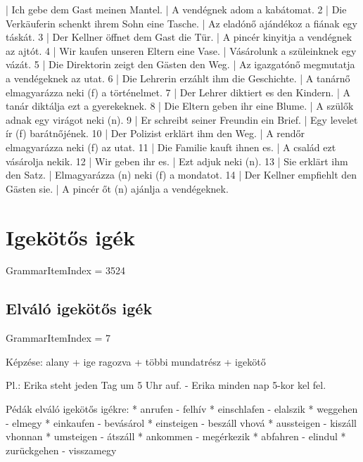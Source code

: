 \documentclass{article}
\newenvironment{desc}{\verbatim}{\endverbatim}
\newenvironment{exmp}{\verbatim}{\endverbatim}
\begin{document}
\begin{exmp}
1 | Ich gebe dem Gast meinen Mantel. | A vendégnek adom a kabátomat.
2 | Die Verkäuferin schenkt ihrem Sohn eine Tasche. | Az eladónő ajándékoz a fiának egy táskát.
3 | Der Kellner öffnet dem Gast die Tür. | A pincér kinyitja a vendégnek az ajtót.
4 | Wir kaufen unseren Eltern eine Vase. | Vásárolunk a szüleinknek egy vázát.
5 | Die Direktorin zeigt den Gästen den Weg. | Az igazgatónő megmutatja a vendégeknek az utat.
6 | Die Lehrerin erzáhlt ihm die Geschichte. | A tanárnő elmagyarázza neki (f) a történelmet.
7 | Der Lehrer diktiert es den Kindern. | A tanár diktálja ezt a gyerekeknek.
8 | Die Eltern geben ihr eine Blume. | A szülők adnak egy virágot neki (n).
9 | Er schreibt seiner Freundin ein Brief. | Egy levelet ír (f) barátnőjének.
10 | Der Polizist erklärt ihm den Weg. | A rendőr elmagyarázza neki (f) az utat.
11 | Die Familie kauft ihnen es. | A család ezt vásárolja nekik.
12 | Wir geben ihr es. | Ezt adjuk neki (n).
13 | Sie erklärt ihm den Satz. | Elmagyarázza (n) neki (f) a mondatot.
14 | Der Kellner empfiehlt den Gästen sie. | A pincér őt (n) ajánlja a vendégeknek.
\end{exmp}

\section{Igekötős igék}

GrammarItemIndex = 3524

\subsection{Elváló igekötős igék}

GrammarItemIndex = 7

\begin{desc}
Képzése: alany + ige ragozva + többi mundatrész + igekötő

Pl.: Erika steht jeden Tag um 5 Uhr auf. - Erika minden nap 5-kor kel fel.

Pédák elváló igekötős igékre:
* anrufen - felhív
* einschlafen - elalszik
* weggehen - elmegy
* einkaufen - bevásárol
* einsteigen - beszáll vhová
* aussteigen - kiszáll vhonnan
* umsteigen - átszáll
* ankommen - megérkezik
* abfahren - elindul
* zurückgehen - visszamegy
\end{desc}
\end{document}
